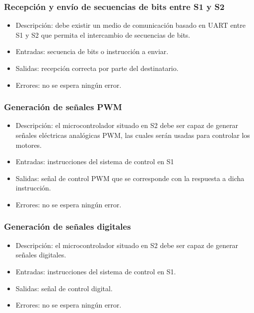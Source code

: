 \subsubsection{Recepción y envío de secuencias de bits entre \ac{S1} y \ac{S2}}
\begin{itemize}
    \item Descripción: debe existir un medio de comunicación basado en \ac{UART} entre \ac{S1} y \ac{S2} que permita el intercambio de secuencias de bits.
    \item Entradas: secuencia de bits o instrucción a enviar.
    \item Salidas: recepción correcta por parte del destinatario.
    \item Errores: no se espera ningún error.
\end{itemize}
\subsubsection{Generación de señales \ac{PWM}}
\begin{itemize}
    \item Descripción: el microcontrolador situado en \ac{S2} debe ser capaz de generar señales eléctricas analógicas \ac{PWM}, las cuales serán usadas para controlar los motores.
    \item Entradas: instrucciones del sistema de control en \ac{S1}
    \item Salidas: señal de control \ac{PWM} que se corresponde con la respuesta a dicha instrucción.
    \item Errores: no se espera ningún error.
\end{itemize}
\subsubsection{Generación de señales digitales}
\begin{itemize}
    \item Descripción: el microcontrolador situado en \ac{S2} debe ser capaz de generar señales digitales.
    \item Entradas: instrucciones del sistema de control en \ac{S1}.
    \item Salidas: señal de control digital.
    \item Errores: no se espera ningún error.
\end{itemize}
